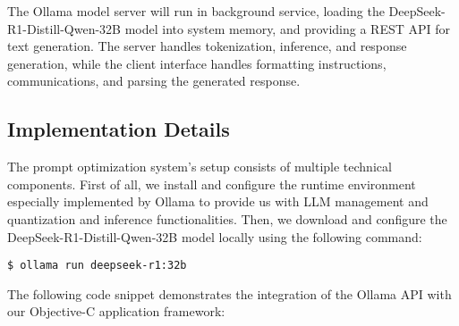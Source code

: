 
The Ollama model server will run in background service, loading the DeepSeek-R1-Distill-Qwen-32B model into system memory, and providing a REST API for text generation. The server handles tokenization, inference, and response generation, while the client interface handles formatting instructions, communications, and parsing the generated response.


\subsection{Implementation Details}

The prompt optimization system’s setup consists of multiple technical components. First of all, we install and configure the runtime environment especially implemented by Ollama to provide us with LLM management and quantization and inference functionalities. Then, we download and configure the DeepSeek-R1-Distill-Qwen-32B model locally using the following command:

\begin{verbatim}
$ ollama run deepseek-r1:32b
\end{verbatim}

The following code snippet demonstrates the integration of the Ollama API with our Objective-C application framework:

